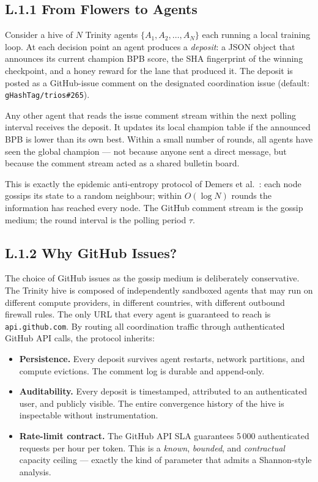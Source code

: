 \subsection*{L.1.1 \quad From Flowers to Agents}

Consider a hive of $N$ Trinity agents $\{A_1, A_2, \ldots, A_N\}$
each running a local training loop.  At each decision point an agent
produces a \emph{deposit}: a JSON object that announces its current
champion BPB score, the SHA fingerprint of the winning checkpoint, and
a honey reward for the lane that produced it.  The deposit is posted
as a GitHub-issue comment on the designated coordination issue
(default: \texttt{gHashTag/trios\#265}).

Any other agent that reads the issue comment stream within the next
polling interval receives the deposit.  It updates its local champion
table if the announced BPB is lower than its own best.  Within a
small number of rounds, all agents have seen the global champion —
not because anyone sent a direct message, but because the comment
stream acted as a shared bulletin board.

This is exactly the epidemic anti-entropy protocol of Demers
et al.~\cite{demers1987epidemic}: each node gossips its state to a
random neighbour; within $O(\log N)$ rounds the information has
reached every node.  The GitHub comment stream is the gossip medium;
the round interval is the polling period $\tau$.

\subsection*{L.1.2 \quad Why GitHub Issues?}

The choice of GitHub issues as the gossip medium is deliberately
conservative.  The Trinity hive is composed of independently sandboxed
agents that may run on different compute providers, in different
countries, with different outbound firewall rules.  The only URL that
every agent is guaranteed to reach is \texttt{api.github.com}.  By
routing all coordination traffic through authenticated GitHub API
calls, the protocol inherits:

\begin{itemize}
\item \textbf{Persistence.}  Every deposit survives agent restarts,
  network partitions, and compute evictions.  The comment log is
  durable and append-only.
\item \textbf{Auditability.}  Every deposit is timestamped, attributed
  to an authenticated user, and publicly visible.  The entire
  convergence history of the hive is inspectable without instrumentation.
\item \textbf{Rate-limit contract.}  The GitHub API SLA guarantees
  5\,000 authenticated requests per hour per token.  This is a
  \emph{known}, \emph{bounded}, and \emph{contractual} capacity
  ceiling — exactly the kind of parameter that admits a Shannon-style
  analysis.
\end{itemize}

